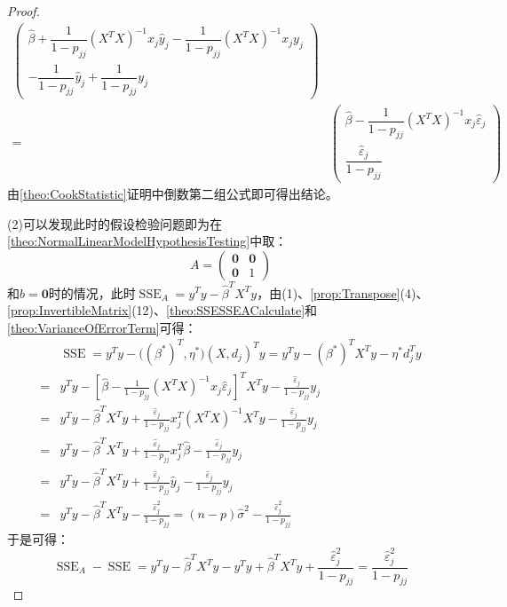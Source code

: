 \begin{proof}
\begin{align*}
\begin{pmatrix}
		\hat{\beta}+\dfrac{1}{1-p_{jj}}(X^TX)^{-1}x_j\hat{y}_j-\dfrac{1}{1-p_{jj}}(X^TX)^{-1}x_jy_j \\
		-\dfrac{1}{1-p_{jj}}\hat{y}_j+\dfrac{1}{1-p_{jj}}y_j
	\end{pmatrix} \\
	=&
	\begin{pmatrix}
		\hat{\beta}-\dfrac{1}{1-p_{jj}}(X^TX)^{-1}x_j\hat{\varepsilon}_j \\
		\dfrac{\hat{\varepsilon}_j}{1-p_{jj}}
	\end{pmatrix}
	\end{align*}
	由\cref{theo:CookStatistic}证明中倒数第二组公式即可得出结论。\par
	(2)可以发现此时的假设检验问题即为在\cref{theo:NormalLinearModelHypothesisTesting}中取：
	\begin{equation*}
		A=
		\begin{pmatrix}
			\mathbf{0} & \mathbf{0} \\
			\mathbf{0} & 1
		\end{pmatrix}
	\end{equation*}
	和$b=\mathbf{0}$时的情况，此时$\operatorname{SSE}_A=y^Ty-\hat{\beta}^TX^Ty$，由(1)、\cref{prop:Transpose}(4)、\cref{prop:InvertibleMatrix}(12)、\cref{theo:SSESSEACalculate}和\cref{theo:VarianceOfErrorTerm}可得：
	\begin{align*}
		&\operatorname{SSE}=y^Ty-\Big((\beta^*)^T,\eta^*\Big)(X,d_j)^Ty=y^Ty-(\beta^*)^TX^Ty-\eta^*d_j^Ty \\
		=&y^Ty-\left[\hat{\beta}-\frac{1}{1-p_{jj}}(X^TX)^{-1}x_j\hat{\varepsilon}_j\right]^TX^Ty-\frac{\hat{\varepsilon}_j}{1-p_{jj}}y_j \\
		=&y^Ty-\hat{\beta}^TX^Ty+\frac{\hat{\varepsilon}_j}{1-p_{jj}}x_j^T(X^TX)^{-1}X^Ty-\frac{\hat{\varepsilon}_j}{1-p_{jj}}y_j \\
		=&y^Ty-\hat{\beta}^TX^Ty+\frac{\hat{\varepsilon}_j}{1-p_{jj}}x_j^T\hat{\beta}-\frac{\hat{\varepsilon}_j}{1-p_{jj}}y_j \\
		=&y^Ty-\hat{\beta}^TX^Ty+\frac{\hat{\varepsilon}_j}{1-p_{jj}}\hat{y}_j-\frac{\hat{\varepsilon}_j}{1-p_{jj}}y_j \\
		=&y^Ty-\hat{\beta}^TX^Ty-\frac{\hat{\varepsilon}_j^2}{1-p_{jj}}=(n-p)\hat{\sigma}^2-\frac{\hat{\varepsilon}_j^2}{1-p_{jj}}
	\end{align*}
	于是可得：
	\begin{equation*}
		\operatorname{SSE}_A-\operatorname{SSE}=y^Ty-\hat{\beta}^TX^Ty-y^Ty+\hat{\beta}^TX^Ty+\frac{\hat{\varepsilon}_j^2}{1-p_{jj}}=\frac{\hat{\varepsilon}_j^2}{1-p_{jj}}

\end{equation*}
\end{proof}
